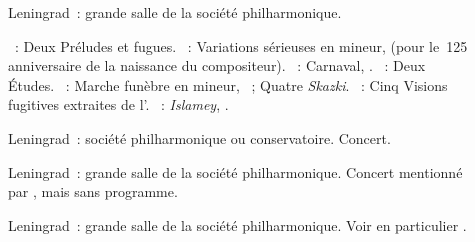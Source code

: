 \begin{description}
 \item[]
 Leningrad~: grande salle de la société philharmonique.

 \textsc{\JBach{}}~: Deux Préludes et fugues.
 \textsc{\Mendelssohn{}}~: Variations sérieuses en \kD mineur, 
 (pour le~125\ieme{} anniversaire de la naissance du compositeur).
 \textsc{\Schumann{}}~: Carnaval, .
 \textsc{\Scriabine{}}~: Deux Études.
 \textsc{\Medtner{}}~: Marche funèbre en \kB mineur,  ~;
 Quatre \emph{Skazki}.
 \textsc{\Prokofiev{}}~: Cinq Visions fugitives extraites de l'.
 \textsc{\Balakirev{}}~: \emph{Islamey}, .
 \item[]
 Leningrad~: société philharmonique ou conservatoire.
 Concert.
 \item[]
 Leningrad~: grande salle de la société philharmonique.
 Concert mentionné par \citet[p.~155]{Nekrasova08}, mais sans programme.
 \item[]
 Leningrad~: grande salle de la société philharmonique.
 Voir en particulier \citet[p.~427]{Milshteyn82a}.


\end{description}
